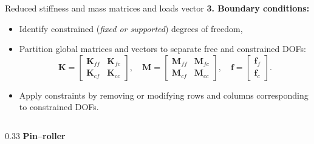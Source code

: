 \documentclass[aspectratio=169]{beamer}
\begin{document}
\begin{frame}{Reduced stiffness and mass matrices and loads vector}
  \textbf{3. Boundary conditions:}
  \begin{itemize}
    \item Identify constrained (\emph{fixed or supported}) degrees of freedom,
    \item Partition global matrices and vectors to separate free and constrained DOFs:
          \[
            \mathbf{K} = \begin{bmatrix}
              \mathbf{K}_{ff} & \mathbf{K}_{fc} \\
              \mathbf{K}_{cf} & \mathbf{K}_{cc}
            \end{bmatrix}, \quad
            \mathbf{M} = \begin{bmatrix}
              \mathbf{M}_{ff} & \mathbf{M}_{fc} \\
              \mathbf{M}_{cf} & \mathbf{M}_{cc}
            \end{bmatrix}, \quad
            \mathbf{f} = \begin{bmatrix}
              \mathbf{f}_{f} \\
              \mathbf{f}_{c}
            \end{bmatrix}.
          \]
    \item Apply constraints by removing or modifying rows and columns corresponding to constrained DOFs.
  \end{itemize}
  \begin{columns}[T,onlytextwidth]
    \begin{column}{0.33\textwidth}
      \centering
      \textbf{Pin--roller}



\end{column}
\end{columns}
\end{frame}
\end{document}
